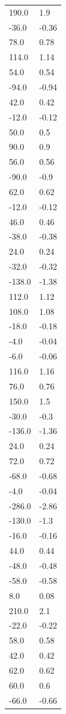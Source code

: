 \begin{longtable}{ll}
190.0 & 1.9 \\
-36.0 & -0.36 \\
78.0 & 0.78 \\
114.0 & 1.14 \\
54.0 & 0.54 \\
-94.0 & -0.94 \\
42.0 & 0.42 \\
-12.0 & -0.12 \\
50.0 & 0.5 \\
90.0 & 0.9 \\
56.0 & 0.56 \\
-90.0 & -0.9 \\
62.0 & 0.62 \\
-12.0 & -0.12 \\
46.0 & 0.46 \\
-38.0 & -0.38 \\
24.0 & 0.24 \\
-32.0 & -0.32 \\
-138.0 & -1.38 \\
112.0 & 1.12 \\
108.0 & 1.08 \\
-18.0 & -0.18 \\
-4.0 & -0.04 \\
-6.0 & -0.06 \\
116.0 & 1.16 \\
76.0 & 0.76 \\
150.0 & 1.5 \\
-30.0 & -0.3 \\
-136.0 & -1.36 \\
24.0 & 0.24 \\
72.0 & 0.72 \\
-68.0 & -0.68 \\
-4.0 & -0.04 \\
-286.0 & -2.86 \\
-130.0 & -1.3 \\
-16.0 & -0.16 \\
44.0 & 0.44 \\
-48.0 & -0.48 \\
-58.0 & -0.58 \\
8.0 & 0.08 \\
210.0 & 2.1 \\
-22.0 & -0.22 \\
58.0 & 0.58 \\
42.0 & 0.42 \\
62.0 & 0.62 \\
60.0 & 0.6 \\
-66.0 & -0.66 \\

\end{longtable}
